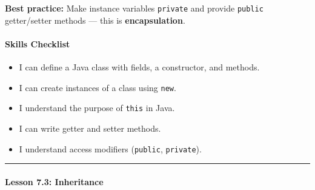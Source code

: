 \documentclass[
  justified,
  openright,
]{tufte-book}
\let\subsection\paragraph
\let\paragraph\paragraph
\let\subsection\paragraph
\let\paragraph\paragraph
\providecommand{\tightlist}{%
  \setlength{\itemsep}{0pt}\setlength{\parskip}{0pt}}
\begin{document}
\textbf{Best practice:} Make instance variables \texttt{private} and
provide \texttt{public} getter/setter methods --- this is
\textbf{encapsulation}.

\subsection{Skills Checklist}\label{skills-checklist-82}

\begin{itemize}
\tightlist
\item[$\square$]
  I can define a Java class with fields, a constructor, and methods.
\item[$\square$]
  I can create instances of a class using \texttt{new}.
\item[$\square$]
  I understand the purpose of \texttt{this} in Java.
\item[$\square$]
  I can write getter and setter methods.
\item[$\square$]
  I understand access modifiers (\texttt{public}, \texttt{private}).
\end{itemize}

\begin{center}\rule{0.5\linewidth}{0.5pt}\end{center}

\subsection{Lesson 7.3: Inheritance}\label{lesson-7.3-inheritance}
\end{document}
